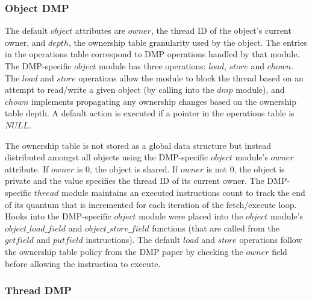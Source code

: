 \subsubsection{Object DMP}

The default $object$ attributes are $owner$, the thread ID of the
object's current owner, and $depth$, the ownership table granularity
used by the object.  The entries in the operations table correspond to
DMP operations handled by that module.  The DMP-specific $object$
module has three operations: $load$, $store$ and $chown$.  The $load$
and $store$ operations allow the module to block the thread based on
an attempt to read/write a given object (by calling into the $dmp$
module), and $chown$ implements propagating any ownership changes
based on the ownership table depth.  A default action is executed if a
pointer in the operations table is $NULL$.

The ownership table is not stored as a global data structure but
instead distributed amongst all objects using the DMP-specific
$object$ module's $owner$ attribute.  If $owner$ is $0$, the object is
shared.  If $owner$ is not $0$, the object is private and the value
specifies the thread ID of its current owner.  The DMP-specific
$thread$ module maintains an executed instructions count to track the
end of its quantum that is incremented for each iteration of the
fetch/execute loop.  Hooks into the DMP-specific $object$ module were
placed into the $object$ module's $object\_load\_field$ and
$object\_store\_field$ functions (that are called from the $getfield$
and $putfield$ instructions).  The default $load$ and $store$
operations follow the ownership table policy from the DMP paper by
checking the $owner$ field before allowing the instruction to execute.

\subsubsection{Thread DMP}

